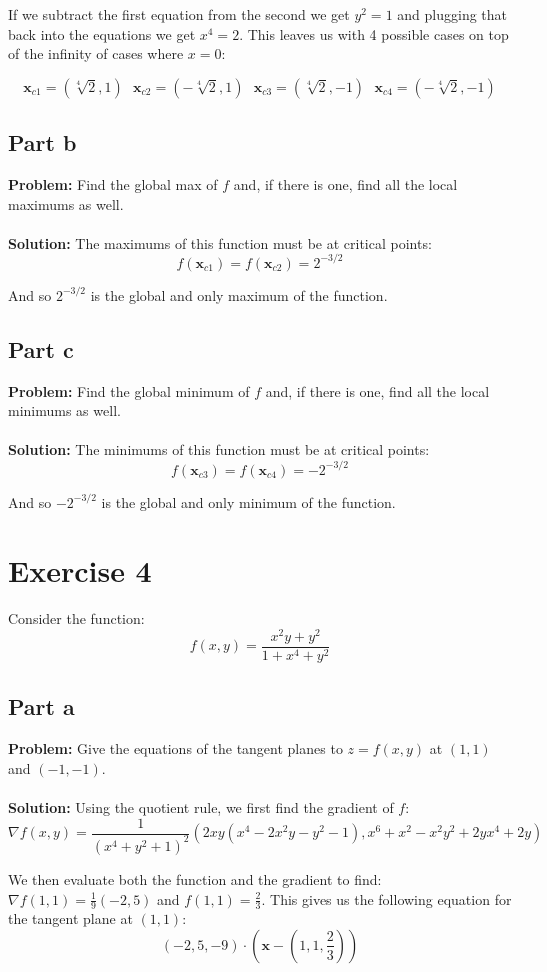 \documentclass{article}
\begin{document}
If we subtract the first equation from the second we get $y^2=1$ and plugging that back into the equations we get $x^4=2$. This leaves us with 4 possible cases on top of the infinity of cases where $x=0$:

$$\mathbf x_{c1}=(\sqrt[4]{2},1)\ \ \  \mathbf x_{c2}=(-\sqrt[4]{2},1)\ \ \  \mathbf x_{c3}=(\sqrt[4]{2},-1)\ \ \  \mathbf x_{c4}=(-\sqrt[4]{2},-1)$$

\subsection*{Part b}
\textbf{Problem:} Find the global max of $f$ and, if there is one, find all the local maximums as well.
\\\\
\textbf{Solution:} The maximums of this function must be at critical points:
$$f(\mathbf x_{c1})=f(\mathbf x_{c2})=2^{-3/2}$$

And so $2^{-3/2}$ is the global and only maximum of the function.

\subsection*{Part c}
\textbf{Problem:} Find the global minimum of $f$ and, if there is one, find all the local minimums as well.
\\\\
\textbf{Solution:} The minimums of this function must be at critical points:
$$f(\mathbf x_{c3})=f(\mathbf x_{c4})=-2^{-3/2}$$

And so $-2^{-3/2}$ is the global and only minimum of the function.

\section*{Exercise 4}
Consider the function:
$$f(x,y)=\frac{x^2y+y^2}{1+x^4+y^2}$$

\subsection*{Part a}
\textbf{Problem:} Give the equations of the tangent planes to $z=f(x,y)$ at $(1,1)$ and $(-1,-1)$.
\\\\
\textbf{Solution:} Using the quotient rule, we first find the gradient of $f$:
$$\nabla f(x,y)=\frac{1}{(x^4+y^2+1)^2}(2xy(x^4-2x^2y-y^2-1),x^6+x^2-x^2y^2+2yx^4+2y)$$

We then evaluate both the function and the gradient to find: $\nabla f(1,1)=\frac{1}{9}(-2,5)$ and $f(1,1)=\frac{2}{3}$. This gives us the following equation for the tangent plane at $(1,1)$:
$$(-2,5,-9)\cdot(\mathbf x-(1,1,\frac{2}{3}))$$
\end{document}
